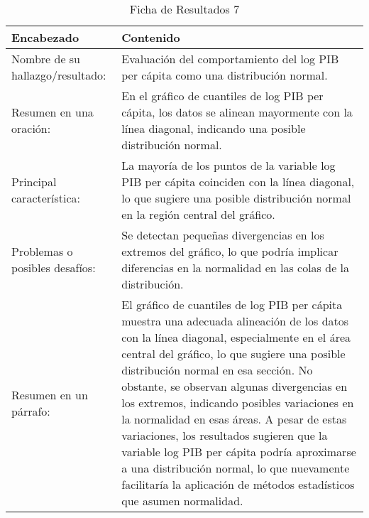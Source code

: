 \begin{table}[H]
    \caption{Ficha de Resultados 7}
    \begin{center}
        \begin{tabular}{  m{3cm} | m{12cm}  }
        \hline
        \textbf{ Encabezado} & \textbf{Contenido }\\ 
        \hline
        Nombre de su hallazgo/resultado: & Evaluación del comportamiento del log PIB per cápita como una distribución normal.\\ 
        \hline
        Resumen en una oración: & En el gráfico de cuantiles de log PIB per cápita, los datos se alinean mayormente con la línea diagonal, indicando una posible distribución normal. \\ 
        \hline
        Principal característica: & La mayoría de los puntos de la variable log PIB per cápita coinciden con la línea diagonal, lo que sugiere una posible distribución normal en la región central del gráfico.\\ 
        \hline
        Problemas o posibles desafíos: & Se detectan pequeñas divergencias en los extremos del gráfico, lo que podría implicar diferencias en la normalidad en las colas de la distribución.\\ 
        \hline
        Resumen en un párrafo: & El gráfico de cuantiles de log PIB per cápita muestra una adecuada alineación de los datos con la línea diagonal, especialmente en el área central del gráfico, lo que sugiere una posible distribución normal en esa sección. No obstante, se observan algunas divergencias en los extremos, indicando posibles variaciones en la normalidad en esas áreas. A pesar de estas variaciones, los resultados sugieren que la variable log PIB per cápita podría aproximarse a una distribución normal, lo que nuevamente facilitaría la aplicación de métodos estadísticos que asumen normalidad. \\ 
        \hline
        \end{tabular}
    \end{center}
\end{table}

